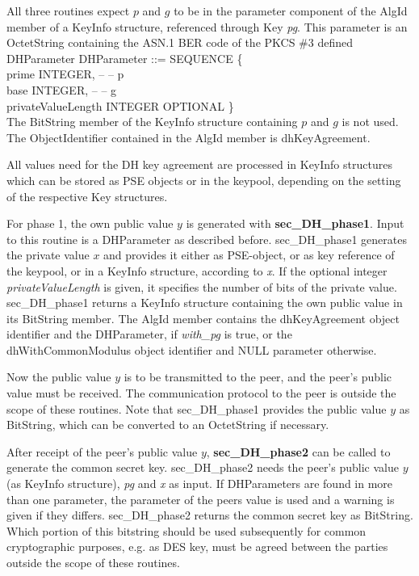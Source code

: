 All three routines expect $p$ and $g$ to be in the parameter component
of the AlgId member of a KeyInfo structure, referenced through Key {\em pg}. 
This parameter is an OctetString containing
the ASN.1 BER code of the PKCS \#3 defined DHParameter
\bvtab
\1 DHParameter ::= SEQUENCE \{ \\
\3 prime \4 INTEGER, -- -- p \\
\3 base  \4 INTEGER, -- -- g \\
\3 privateValueLength \4 INTEGER OPTIONAL \} \\
\evtab
The BitString member of the KeyInfo structure containing $p$ and $g$ is not used.
The ObjectIdentifier contained in the AlgId member is dhKeyAgreement.

All values need for the DH key agreement are processed in KeyInfo structures which
can be stored as PSE objects or in the keypool, depending on the setting of the
respective Key structures.

For phase 1, the own public value $y$ is generated with {\bf sec\_DH\_phase1}. Input to
this routine is a DHParameter as described before. 
sec\_DH\_phase1 generates the private value $x$ and provides
it either as PSE-object, or as key reference of the keypool, or in a KeyInfo structure,
according to {\em x}. If the optional integer {\em privateValueLength } is given, it specifies the
number of bits of the private value. sec\_DH\_phase1 returns a KeyInfo structure containing the own public value
in its BitString member. The AlgId member contains the dhKeyAgreement object identifier
and the DHParameter, if {\em with\_pg} is true, or the dhWithCommonModulus object identifier
and NULL parameter otherwise.

Now the public value $y$ is to be transmitted to the peer, and the peer's public value
must be received. The communication protocol to the peer is outside the scope of these
routines. Note that sec\_DH\_phase1 provides the public value $y$ as BitString, which
can be converted to an OctetString if necessary.

After receipt of the peer's public value $y$, {\bf sec\_DH\_phase2} can be called to
generate the common secret key. sec\_DH\_phase2 needs the peer's public value $y$
(as KeyInfo structure), {\em pg} and {\em x} as input. If DHParameters are found in more
than one parameter, the parameter of the peers value is used and a warning is given if they differs.
sec\_DH\_phase2 returns the common secret
key as BitString. Which portion of this bitstring should be used subsequently for common
cryptographic purposes, e.g. as DES key, must be agreed between the parties outside the
scope of these routines.

